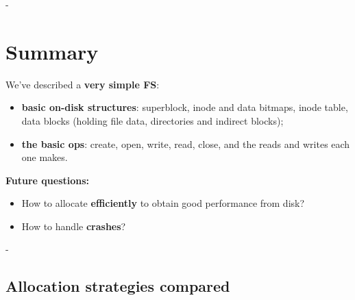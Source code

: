 \documentclass[11pt,a4paper]{article}
\makeatletter
\newcommand{\keepspace}[1]{\par\penalty-100\begingroup
  \setlength{\dimen@}{#1}\dimen@ii\pagegoal\advance\dimen@ii-\pagetotal
  \ifdim\dimen@>\dimen@ii\ifdim\dimen@ii>\z@\vfil\fi\break\fi\endgroup}
\makeatother
\begin{document}
\keepspace{8\baselineskip}
\section{Summary}

\begin{keybox}
We've described a \textbf{very simple FS}:
\begin{itemize}
  \item \textbf{basic on-disk structures}: superblock, inode and data
        bitmaps, inode table, data blocks (holding file data, directories
        and indirect blocks);
  \item \textbf{the basic ops}: create, open, write, read, close, and the
        reads and writes each one makes.
\end{itemize}
\textbf{Future questions:}
\begin{itemize}
  \item How to allocate \textbf{efficiently} to obtain good performance
        from disk?
  \item How to handle \textbf{crashes}?
\end{itemize}
\end{keybox}


\keepspace{8\baselineskip}
\subsection*{Allocation strategies compared}
\end{document}
